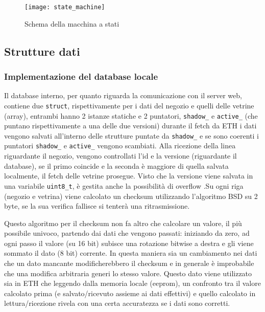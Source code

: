 \begin{figure}[ht]
	\texttt{[image: state\_machine]}
  \caption{Schema della macchina a stati}
  \label{fig:sm}
\end{figure}

\subsection{Strutture dati}

\subsubsection{Implementazione del database locale}


Il database interno, per quanto riguarda la comunicazione con il server web, contiene due \texttt{struct}, rispettivamente per i dati del negozio e quelli delle vetrine (array), entrambi hanno 2 istanze statiche e 2 puntatori, \texttt{shadow\_} e \texttt{active\_} (che puntano rispettivamente a una delle due versioni) durante il fetch da ETH i dati vengono salvati all'interno delle strutture puntate da \texttt{shadow\_} e se sono coerenti i puntatori \texttt{shadow\_} e \texttt{active\_} vengono scambiati. Alla ricezione della linea riguardante il negozio, vengono controllati l'id e la versione (riguardante il database), se il primo coincide e la seconda \`e maggiore di quella salvata localmente, il fetch delle vetrine prosegue. Visto che la versione viene salvata in una variabile \texttt{uint8\_t}, \`e gestita anche la possibilit\`a di overflow .Su ogni riga (negozio e vetrina) viene calcolato un checksum utilizzando l'algoritmo BSD su 2 byte, se la sua verifica fallisce si tenter\`a una ritrasmissione.

Questo algoritmo per il checksum non fa altro che calcolare un valore, il pi\`u possibile univoco, partendo dai dati che vengono passati: iniziando da zero, ad ogni passo il valore (su 16 bit) subisce una rotazione bitwise a destra e gli viene sommato il dato (8 bit) corrente. In questa maniera sia un cambiamento nei dati che un dato mancante modificherebbero il checksum e in generale \`e improbabile che una modifica arbitraria generi lo stesso valore. Questo dato viene utilizzato sia in ETH che leggendo dalla memoria locale (eeprom), un confronto tra il valore calcolato prima (e salvato/ricevuto assieme ai dati effettivi) e quello calcolato in lettura/ricezione rivela con una certa accuratezza se i dati sono corretti.

